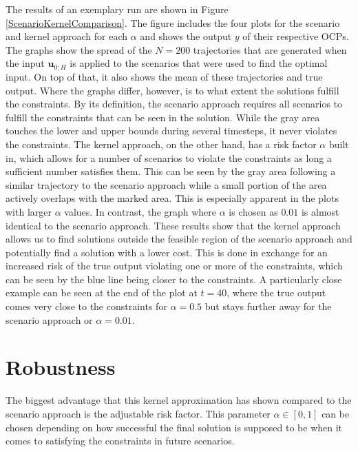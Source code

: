 The results of an exemplary run are shown in Figure \ref{ScenarioKernelComparison}. The figure includes the four plots for the scenario and kernel approach for each $\alpha$ and shows the output $y$ of their respective OCPs. The graphs show the spread of the $N = 200$ trajectories that are generated when the input $\boldsymbol{u}_{0:H}$ is applied to the scenarios that were used to find the optimal input. On top of that, it also shows the mean of these trajectories and true output. Where the graphs differ, however, is to what extent the solutions fulfill the constraints. By its definition, the scenario approach requires all scenarios to fulfill the constraints that can be seen in the solution. While the gray area touches the lower and upper bounds during several timesteps, it never violates the constraints. The kernel approach, on the other hand, has a risk factor $\alpha$ built in, which allows for a number of scenarios to violate the constraints as long a sufficient number satisfies them. This can be seen by the gray area following a similar trajectory to the scenario approach while a small portion of the area actively overlaps with the marked area. This is especially apparent in the plots with larger $\alpha$ values. In contrast, the graph where $\alpha$ is chosen as $0.01$ is almost identical to the scenario approach. These results show that the kernel approach allows us to find solutions outside the feasible region of the scenario approach and potentially find a solution with a lower cost. This is done in exchange for an increased risk of the true output violating one or more of the constraints, which can be seen by the blue line being closer to the constraints. A particularly close example can be seen at the end of the plot at $t = 40$, where the true output comes very close to the constraints for $\alpha = 0.5$ but stays further away for the scenario approach or $\alpha = 0.01$.



\section{Robustness} \label{performance guarantees}

The biggest advantage that this kernel approximation has shown compared to the scenario approach is the adjustable risk factor. This parameter $\alpha \in [0, 1]$ can be chosen depending on how successful the final solution is supposed to be when it comes to satisfying the constraints in future scenarios. 


